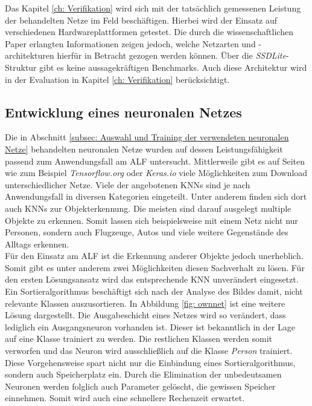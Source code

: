 		Das Kapitel \ref{ch: Verifikation} wird sich mit der tatsächlich gemessenen Leistung der behandelten Netze im Feld beschäftigen. Hierbei wird der Einsatz auf verschiedenen Hardwareplattformen getestet. Die durch die wissenschaftlichen Paper erlangten Informationen zeigen jedoch, welche Netzarten und -architekturen hierfür in Betracht gezogen werden können. Über die \textit{SSDLite}-Struktur gibt es keine aussagekräftigen Benchmarks. Auch diese Architektur wird in der Evaluation in Kapitel \ref{ch: Verifikation} berücksichtigt.
		
		\subsection{Entwicklung eines neuronalen Netzes}
		\label{subsec: Entwickeltes neuronales Netz}
		
		Die in Abschnitt \ref{subsec: Auswahl und Training der verwendeten neuronalen Netze} behandelten neuronalen Netze wurden auf dessen Leistungsfähigkeit passend zum Anwendungsfall am ALF untersucht. Mittlerweile gibt es auf Seiten wie zum Beispiel \textit{Tensorflow.org} oder \textit{Keras.io} viele Möglichkeiten zum Download unterschiedlicher Netze. Viele der angebotenen KNNs sind je nach Anwendungsfall in diversen Kategorien eingeteilt. Unter anderem finden sich dort auch KNNs zur Objekterkennung. Die meisten sind darauf ausgelegt multiple Objekte zu erkennen. Somit lassen sich beispielsweise mit einem Netz nicht nur Personen, sondern auch Flugzeuge, Autos und viele weitere Gegenstände des Alltags erkennen. \\ 
		
		
		
		Für den Einsatz am ALF ist die Erkennung anderer Objekte jedoch unerheblich. Somit gibt es unter anderem zwei Möglichkeiten diesen Sachverhalt zu lösen. Für den ersten Lösungsansatz wird das entsprechende KNN unverändert eingesetzt. Ein Sortieralgorithmus beschäftigt sich nach der Analyse des Bildes damit, nicht relevante Klassen auszusortieren. In Abbildung \ref{fig: ownnet} ist eine weitere Lösung dargestellt. Die Ausgabeschicht eines Netzes wird so verändert, dass lediglich ein Ausgangsneuron vorhanden ist. Dieser ist bekanntlich in der Lage auf eine Klasse trainiert zu werden. Die restlichen Klassen werden somit verworfen und das Neuron wird ausschließlich auf die Klasse \textit{Person} trainiert. Diese Vorgehensweise spart nicht nur die Einbindung eines Sortieralgorithmus, sondern auch Speicherplatz ein. Durch die Elimination der unbedeutsamen Neuronen werden folglich auch Parameter gelöscht, die gewissen Speicher einnehmen. Somit wird auch eine schnellere Rechenzeit erwartet. \\
		

